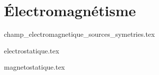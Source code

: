 \part{Électromagnétisme}

{champ_electromagnetique_sources_symetries.tex}

{electrostatique.tex}

{magnetostatique.tex}